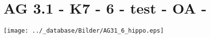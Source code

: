 \section{AG 3.1 - K7 - 6 - test - OA - }

\begin{beispiel}[AG 3.1]{1}
\texttt{[image: ../\_database/Bilder/AG31\_6\_hippo.eps]}
\end{beispiel}